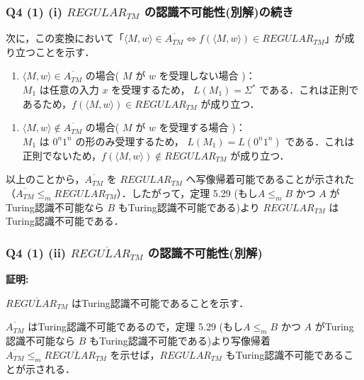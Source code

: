 \begin{frame}[fragile]
\frametitle{Q4 (1) \hspace{3mm} (i) $REGULAR_{TM}$ の認識不可能性(別解)の続き}

次に，この変換において「$\langle M, w \rangle \in \overline{A_{TM}} \Leftrightarrow f(\langle M, w \rangle) \in REGULAR_{TM}$」が成り立つことを示す．

\begin{enumerate}
  \item[・] $\langle M, w \rangle \in \overline{A_{TM}}$ の場合( $M$ が $w$ を受理しない場合 )： \\
$M_{1}$ は任意の入力 $x$ を受理するため， $L(M_{1}) = \Sigma^{\ast}$ である．これは正則であるため，$f(\langle M, w \rangle) \in REGULAR_{TM}$ が成り立つ．
\end{enumerate}

\begin{enumerate}
  \item[・] $\langle M, w \rangle \notin \overline{A_{TM}}$ の場合( $M$ が $w$ を受理する場合 )： \\
$M_{1}$ は $0^{n}1^{n}$ の形のみ受理するため， $L(M_{1}) = L(0^{n}1^{n})$ である．これは正則でないため，$f(\langle M, w \rangle) \notin REGULAR_{TM}$ が成り立つ．
\end{enumerate}

以上のことから，$\overline{A_{TM}}$ を $REGULAR_{TM}$ へ写像帰着可能であることが示された（$\overline{A_{TM}} \le_{m} REGULAR_{TM}$）．したがって，定理 5.29 (もし$A \le_{m} B$ かつ $A$ がTuring認識不可能なら $B$ もTuring認識不可能である)より $REGULAR_{TM}$ はTuring認識不可能である．

\end{frame}




\begin{frame}[fragile]
\frametitle{Q4 (1) \hspace{3mm} (ii) $\overline{REGULAR_{TM}}$ の認識不可能性(別解)}

\textbf{証明:}

$\overline{REGULAR_{TM}}$ はTuring認識不可能であることを示す．

$\overline{A_{TM}}$ はTuring認識不可能であるので，定理 5.29 (もし$A \le_{m} B$ かつ $A$ がTuring認識不可能なら $B$ もTuring認識不可能である)より写像帰着 $\overline{A_{TM}} \le_{m} \overline{REGULAR_{TM}}$ を示せば，$\overline{REGULAR_{TM}}$ もTuring認識不可能であることが示される．

\end{frame}



